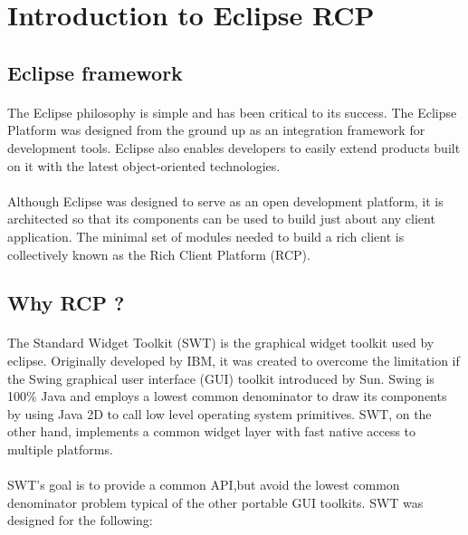 \section{Introduction to Eclipse RCP}
\subsection{Eclipse framework}

\paragraph{}
The Eclipse philosophy is simple and has been critical to its success. The Eclipse Platform was designed from the ground up as an integration framework for development tools. Eclipse also enables developers to easily extend products built on it with the latest object-oriented technologies.

\paragraph{}
Although Eclipse was designed to serve as an open development platform, it is architected so that its components can be used to build just about any client application. The minimal set of modules needed to build a rich client is collectively known as the Rich Client Platform (RCP).

\subsection{Why RCP ?}

\paragraph{}
The Standard Widget Toolkit (SWT) is the graphical widget toolkit used by eclipse. Originally developed by IBM, it was created to overcome the limitation if the Swing graphical user interface (GUI) toolkit introduced by Sun. Swing is 100\% Java and employs a lowest common denominator to draw its components by using Java 2D to call low level operating system primitives. SWT, on the other hand, implements a common widget layer with fast native access to multiple platforms.

\paragraph{}
SWT's goal is to provide a common API,but avoid the lowest common denominator problem typical of the other portable GUI toolkits. SWT was designed for the following: 

